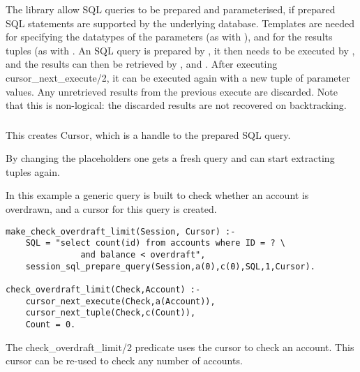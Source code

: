 \begin{sloppypar}
The library allow SQL queries to be prepared and parameterised, if prepared
SQL statements are supported by the underlying database. Templates are needed
for specifying the datatypes of the parameters (as with
),
and for the results tuples (as with . An SQL query
is prepared by
,
it then needs to be executed by
,
and the results can then be retrieved by ,
 and
. After
executing cursor_next_execute/2, it can be executed again with a new tuple
of parameter values. Any unretrieved results from the previous execute are
discarded. Note that this is non-logical: the discarded results are not
recovered on backtracking.
\end{sloppypar}

\subsubsection
{}
\label{session-prepare-sql-query/5}

This creates Cursor, which is a handle to the prepared SQL query.

By changing the placeholders one gets a fresh query and can start extracting
tuples again.


In this example a generic query is built to check whether an account is
overdrawn, and a cursor for this query is created.
\begin{verbatim}
make_check_overdraft_limit(Session, Cursor) :-
    SQL = "select count(id) from accounts where ID = ? \
               and balance < overdraft",
    session_sql_prepare_query(Session,a(0),c(0),SQL,1,Cursor).

check_overdraft_limit(Check,Account) :-
    cursor_next_execute(Check,a(Account)),
    cursor_next_tuple(Check,c(Count)),
    Count = 0.
\end{verbatim}
The check_overdraft_limit/2 predicate uses the cursor to check an account.
This cursor can be re-used to check any number of accounts.



